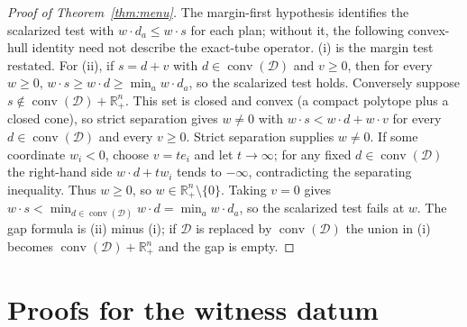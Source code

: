 \documentclass[preprint,11pt,authoryear]{elsarticle}
\theoremstyle{definition}
\theoremstyle{remark}
\newcommand{\conv}{\operatorname{conv}}
\newcommand{\Rp}{\mathbb{R}^n_+}
\begin{document}
\begin{proof}[Proof of Theorem~\ref{thm:menu}]
The margin-first hypothesis identifies the scalarized test with $w\cdot d_a\le w\cdot s$ for each plan; without it, the following convex-hull identity need not describe the exact-tube operator. (i) is the margin test restated. For (ii), if $s=d+v$ with $d\in\conv(\mathcal D)$ and $v\ge0$, then for every $w\ge0$, $w\cdot s\ge w\cdot d\ge\min_aw\cdot d_a$, so the scalarized test holds. Conversely suppose $s\notin\conv(\mathcal D)+\Rp$. This set is closed and convex (a compact polytope plus a closed cone), so strict separation gives $w\ne0$ with $w\cdot s<w\cdot d+w\cdot v$ for every $d\in\conv(\mathcal D)$ and every $v\ge0$. Strict separation supplies $w\ne0$. If some coordinate $w_i<0$, choose $v=t e_i$ and let $t\to\infty$; for any fixed $d\in\conv(\mathcal D)$ the right-hand side $w\cdot d+t w_i$ tends to $-\infty$, contradicting the separating inequality. Thus $w\ge0$, so $w\in\Rp\setminus\{0\}$. Taking $v=0$ gives $w\cdot s<\min_{d\in\conv(\mathcal D)}w\cdot d=\min_aw\cdot d_a$, so the scalarized test fails at $w$. The gap formula is (ii) minus (i); if $\mathcal D$ is replaced by $\conv(\mathcal D)$ the union in (i) becomes $\conv(\mathcal D)+\Rp$ and the gap is empty.
\end{proof}

\section{Proofs for the witness datum}\label{app:witness}
\end{document}
